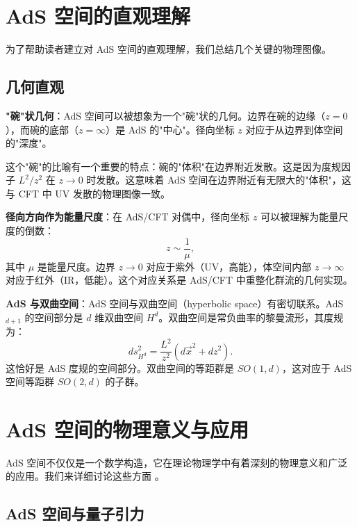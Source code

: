 \section{AdS 空间的直观理解}

为了帮助读者建立对 AdS 空间的直观理解，我们总结几个关键的物理图像。

\subsection{几何直观}

\textbf{"碗"状几何}：AdS 空间可以被想象为一个"碗"状的几何。边界在碗的边缘（$z = 0$），而碗的底部（$z = \infty$）是 AdS 的"中心"。径向坐标 $z$ 对应于从边界到体空间的"深度"。

这个"碗"的比喻有一个重要的特点：碗的"体积"在边界附近发散。这是因为度规因子 $L^2/z^2$ 在 $z \to 0$ 时发散。这意味着 AdS 空间在边界附近有无限大的"体积"，这与 CFT 中 UV 发散的物理图像一致。

\textbf{径向方向作为能量尺度}：在 AdS/CFT 对偶中，径向坐标 $z$ 可以被理解为能量尺度的倒数：
\begin{equation}
    z \sim \frac{1}{\mu},
\end{equation}
其中 $\mu$ 是能量尺度。边界 $z \to 0$ 对应于紫外（UV，高能），体空间内部 $z \to \infty$ 对应于红外（IR，低能）。这个对应关系是 AdS/CFT 中重整化群流的几何实现。

\textbf{AdS 与双曲空间}：AdS 空间与双曲空间（hyperbolic space）有密切联系。AdS$_{d+1}$ 的空间部分是 $d$ 维双曲空间 $H^d$。双曲空间是常负曲率的黎曼流形，其度规为：
\begin{equation}
    ds^2_{H^d} = \frac{L^2}{z^2} \left( d\vec{x}^2 + dz^2 \right).
\end{equation}
这恰好是 AdS 度规的空间部分。双曲空间的等距群是 $SO(1,d)$，这对应于 AdS 空间等距群 $SO(2,d)$ 的子群。

\section{AdS 空间的物理意义与应用}

AdS 空间不仅仅是一个数学构造，它在理论物理学中有着深刻的物理意义和广泛的应用。我们来详细讨论这些方面 \cite{Maldacena1997}。

\subsection{AdS 空间与量子引力}

